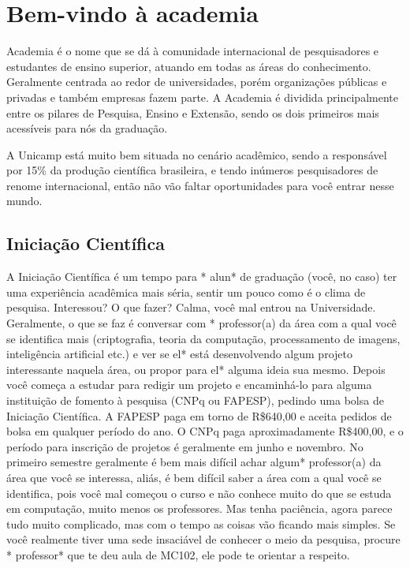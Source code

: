 
\section{Bem-vindo à academia}

Academia é o nome que se dá à comunidade internacional de pesquisadores e
estudantes de ensino superior, atuando em todas as áreas do
conhecimento. Geralmente centrada ao redor de universidades, porém organizações
públicas e privadas e também empresas fazem parte. A Academia é dividida
principalmente entre os pilares de Pesquisa, Ensino e Extensão, sendo os dois
primeiros mais acessíveis para nós da graduação.

A Unicamp está muito bem situada no cenário acadêmico, sendo a responsável por
15\% da produção científica brasileira, e tendo inúmeros pesquisadores de
renome internacional, então não vão faltar oportunidades para você entrar nesse
mundo.

\subsection{Iniciação Científica}

A Iniciação Científica é um tempo para * alun* de graduação (você, no caso) ter
uma experiência acadêmica mais séria, sentir um pouco como é o clima de
pesquisa. Interessou? O que fazer? Calma, você mal entrou na Universidade.
Geralmente, o que se faz é conversar com * professor(a) da área com a qual você
se identifica mais (criptografia, teoria da computação, processamento de
imagens, inteligência artificial etc.) e ver se el* está desenvolvendo algum
projeto interessante naquela área, ou propor para el* alguma ideia sua mesmo.
Depois você começa a estudar para redigir um projeto e encaminhá-lo para alguma
instituição de fomento à pesquisa (CNPq ou FAPESP), pedindo uma bolsa de
Iniciação Científica. A FAPESP paga em torno de R\$640,00 e aceita pedidos de
bolsa em qualquer período do ano. O CNPq paga aproximadamente R\$400,00, e o
período para inscrição de projetos é geralmente em junho e novembro. No
primeiro semestre geralmente é bem mais difícil achar algum* professor(a) da
área que você se interessa, aliás, é bem difícil saber a área com a qual você
se identifica, pois você mal começou o curso e não conhece muito do que se
estuda em computação, muito menos os professores. Mas tenha paciência, agora
parece tudo muito complicado, mas com o tempo as coisas vão ficando mais
simples. Se você realmente tiver uma sede insaciável de conhecer o meio da
pesquisa, procure * professor* que te deu aula de MC102, ele pode te orientar a
respeito.

